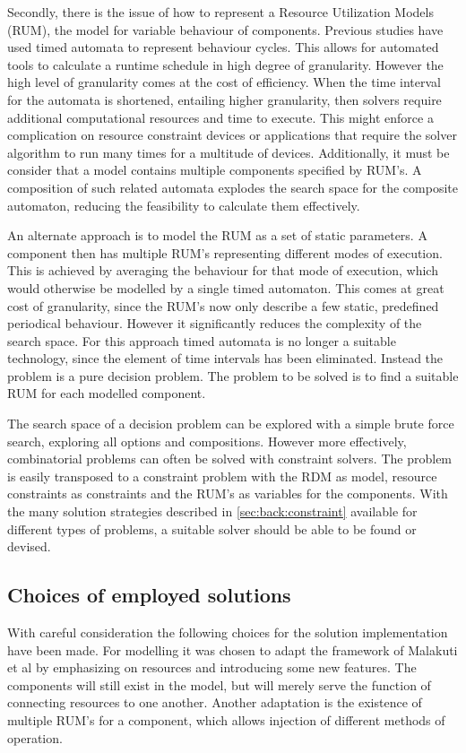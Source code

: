 Secondly, there is the issue of how to represent a Resource Utilization Models (RUM)\cite{steven_te_brinke}, the model for variable behaviour of components. Previous studies have used timed automata to represent behaviour cycles\cite{rum_basis_89, steven_te_brinke}. This allows for automated tools to calculate a runtime schedule in high degree of granularity. However the high level of granularity comes at the cost of efficiency. When the time interval for the automata is shortened, entailing higher granularity, then solvers require additional computational resources and time to execute. This might enforce a complication on resource constraint devices or applications that require the solver algorithm to run many times for a multitude of devices. Additionally, it must be consider that a model contains multiple components specified by RUM's. A composition of such related automata explodes the search space for the composite automaton, reducing the feasibility to calculate them effectively.

An alternate approach is to model the RUM as a set of static parameters. A component then has multiple RUM's representing different modes of execution. This is achieved by averaging the behaviour for that mode of execution, which would otherwise be modelled by a single timed automaton. This comes at great cost of granularity, since the RUM's now only describe a few static, predefined periodical behaviour. However it significantly reduces the complexity of the search space. For this approach timed automata is no longer a suitable technology, since the element of time intervals has been eliminated. Instead the problem is a pure decision problem. The problem to be solved is to find a suitable RUM for each modelled component. 

The search space of a decision problem can be explored with a simple brute force search, exploring all options and compositions. However more effectively, combinatorial problems can often be solved with constraint solvers. The problem is easily transposed to a constraint problem with the RDM as model, resource constraints as constraints and the RUM's as variables for the components. With the many solution strategies described in \ref{sec:back:constraint} available for different types of problems, a suitable solver should be able to be found or devised.

\subsection{Choices of employed solutions}
\label{sub:choices}
With careful consideration the following choices for the solution implementation have been made. For modelling it was chosen to adapt the framework of Malakuti et al\cite{steven_te_brinke} by emphasizing on resources and introducing some new features. The components will still exist in the model, but will merely serve the function of connecting resources to one another. Another adaptation is the existence of multiple RUM's for a component, which allows injection of different methods of operation.

